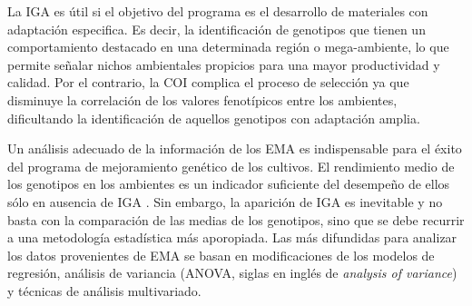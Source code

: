 La IGA es útil si el objetivo del programa es el desarrollo de materiales con adaptación especifica. Es decir, la identificación de genotipos que tienen un comportamiento destacado en una determinada región o mega-ambiente, lo que permite señalar nichos ambientales propicios para una mayor productividad y calidad. Por el contrario, la COI complica el proceso de selección ya que disminuye la correlación de los valores fenotípicos entre los ambientes, dificultando la identificación de aquellos genotipos con adaptación amplia.

Un análisis adecuado de la información de los EMA es indispensable para el éxito del programa de mejoramiento genético de los cultivos. El rendimiento medio de los genotipos en los ambientes es un indicador suficiente del desempeño de ellos sólo en ausencia de IGA \citep{YanKang2003}. Sin embargo, la aparición de IGA es inevitable y no basta con la comparación de las medias de los genotipos, sino que se debe recurrir a una metodología estadística más aporopiada. Las más difundidas para analizar los datos provenientes de EMA se basan en modificaciones de los modelos de regresión, análisis de variancia (ANOVA, siglas en inglés de \emph{analysis of variance}) y técnicas de análisis multivariado. 

